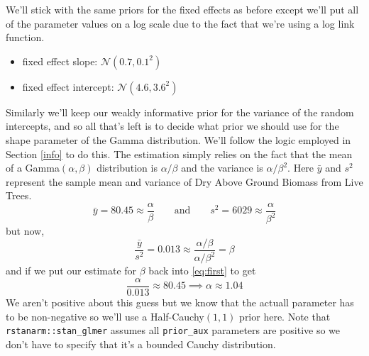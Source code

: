 \documentclass[12pt,twoside]{reedthesis}
\providecommand{\tightlist}{%
  \setlength{\itemsep}{0pt}\setlength{\parskip}{0pt}}
\begin{document}
We'll stick with the same priors for the fixed effects as before except we'll put all of the parameter values on a log scale due to the fact that we're using a log link function.
\begin{itemize}
\tightlist
\item
  fixed effect slope: \(\mathcal{N}(0.7, 0.1^2)\)
\item
  fixed effect intercept: \(\mathcal{N}(4.6, 3.6^2)\)
\end{itemize}
Similarly we'll keep our weakly informative prior for the variance of the random intercepts, and so all that's left is to decide what prior we should use for the shape parameter of the Gamma distribution. We'll follow the logic employed in Section \ref{info} to do this. The estimation simply relies on the fact that the mean of a Gamma\((\alpha, \beta)\) distribution is \(\alpha/\beta\) and the variance is \(\alpha/\beta^2\). Here \(\bar{y}\) and \(s^2\) represent the sample mean and variance of Dry Above Ground Biomass from Live Trees.
\begin{equation}
\bar{y} = 80.45 \approx \frac{\alpha}{\beta}\qquad \text{and} \qquad s^2 = 6029 \approx \frac{\alpha}{\beta^2}
\label{eq:first}
\end{equation}
but now,
\begin{equation}
\frac{\bar{y}}{s^2} = 0.013 \approx \frac{\alpha / \beta}{\alpha / \beta^2} = \beta 
\end{equation}
and if we put our estimate for \(\beta\) back into \eqref{eq:first} to get
\begin{equation}
\frac{\alpha}{0.013} \approx 80.45 \implies \alpha \approx 1.04
\end{equation}
We aren't positive about this guess but we know that the actuall parameter has to be non-negative so we'll use a Half-Cauchy\((1, 1)\) prior here. Note that \texttt{rstanarm::stan\_glmer} assumes all \texttt{prior\_aux} parameters are positive so we don't have to specify that it's a bounded Cauchy distribution.
\end{document}
